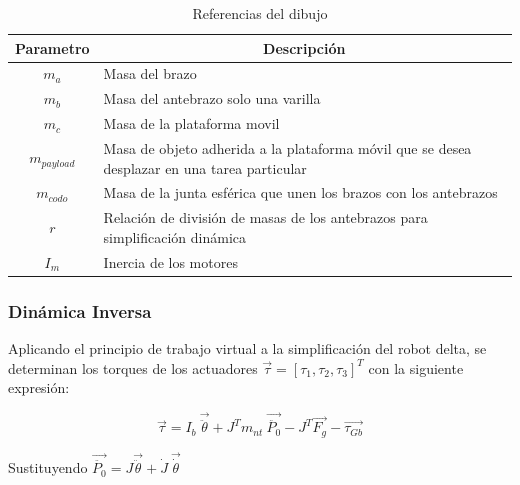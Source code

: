         \begingroup
            \renewcommand{\arraystretch}{1.5}
            \begin{table}[H]
            \centering
            \begin{tabular}{c m{12cm}}
               \hline
               \textbf{Parametro}  & \multicolumn{1}{c}{\textbf{Descripción}}  \\
               \hline           \hline            
            $m_{a}$ & Masa del brazo\\
            \hline
            $m_{b}$ & Masa del antebrazo solo una varilla\\
            \hline
            $m_{c}$ & Masa de la plataforma movil\\
            \hline
            $m_{payload}$ & Masa de objeto adherida a la plataforma móvil que se desea desplazar en una tarea particular\\
            \hline
            $m_{codo}$ & Masa de la junta esférica que unen los brazos con los antebrazos\\
            \hline
            $r$ & Relación de división de masas de los antebrazos para simplificación dinámica\\
            \hline
            $I_{m}$ & Inercia de los motores\\
            \hline
            \end{tabular}
            \caption{Referencias del dibujo}
           \label{tab:cap4_tabla_13333}
        \end{table}
        \endgroup 
\newpage


        \subsubsection{Dinámica Inversa}

        Aplicando el principio de trabajo virtual a la simplificación del robot delta, se determinan los torques de los actuadores  $ \overrightarrow{ \tau}= \left[  \tau_{1}, \tau_{2}, \tau_{3} \right] ^{T} $  con la siguiente expresión:
        
        \begin{equation}
             \overrightarrow{ \tau}=I_{b}~\overrightarrow{\ddot{ \theta }}+J^{T}m_{nt}~\overrightarrow{\ddot{P_{0}}}- J^{T}\overrightarrow{F_{g}}-\overrightarrow{ \tau_{Gb}} 
            \label{eq:cap4_MB_23}
        \end{equation}
        
        Sustituyendo  $ \overrightarrow{\ddot{P_{0}}}=J\overrightarrow{\ddot{ \theta }}+\dot{J}~\overrightarrow{\dot{ \theta }} $
        
